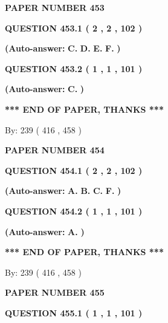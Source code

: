 \documentclass[12pt]{article}
\begin{document}
   
   
   
\newpage 
\setcounter{page}{ 
   453001 } 
   
   
 {\textbf{ \Large{ PAPER NUMBER  453  }}}
   
   
  
  
{\textbf{\large{QUESTION
453.1 
 ( 2 , 2 , 102 )
}}}
 
 
{\textbf{(Auto-answer:}}
{\textbf{\large{
C.}}}
{\textbf{\large{
D.}}}
{\textbf{\large{
E.}}}
{\textbf{\large{
F.}}}
{\textbf{)}}
 
 
  
  
{\textbf{\large{QUESTION
453.2 
 ( 1 , 1 , 101 )
}}}
 
 
{\textbf{(Auto-answer:}}
{\textbf{\large{
C.}}}
{\textbf{)}}
 
 
   
   
\vspace{1.0in} 
{\textbf{\large{ *** END OF PAPER, THANKS *** }}} 
   
   
\hspace{1.0in} By: 
 239 ( 416 ,  458 )
   
   
   
   
\newpage 
\setcounter{page}{ 
   454001 } 
   
   
 {\textbf{ \Large{ PAPER NUMBER  454  }}}
   
   
  
  
{\textbf{\large{QUESTION
454.1 
 ( 2 , 2 , 102 )
}}}
 
 
{\textbf{(Auto-answer:}}
{\textbf{\large{
A.}}}
{\textbf{\large{
B.}}}
{\textbf{\large{
C.}}}
{\textbf{\large{
F.}}}
{\textbf{)}}
 
 
  
  
{\textbf{\large{QUESTION
454.2 
 ( 1 , 1 , 101 )
}}}
 
 
{\textbf{(Auto-answer:}}
{\textbf{\large{
A.}}}
{\textbf{)}}
 
 
   
   
\vspace{1.0in} 
{\textbf{\large{ *** END OF PAPER, THANKS *** }}} 
   
   
\hspace{1.0in} By: 
 239 ( 416 ,  458 )
   
   
   
   
\newpage 
\setcounter{page}{ 
   455001 } 
   
   
 {\textbf{ \Large{ PAPER NUMBER  455  }}}
   
   
  
  
{\textbf{\large{QUESTION
455.1 
 ( 1 , 1 , 101 )
}}}
 
\end{document}
